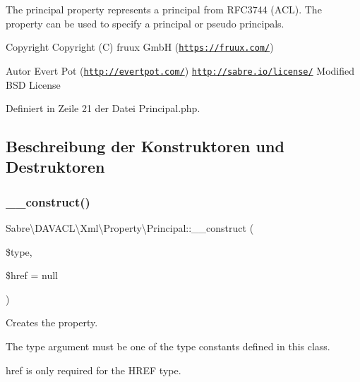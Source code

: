 The principal property represents a principal from R\+F\+C3744 (A\+CL). The property can be used to specify a principal or pseudo principals.

\begin{DoxyCopyright}{Copyright}
Copyright (C) fruux GmbH (\href{https://fruux.com/}{\tt https\+://fruux.\+com/}) 
\end{DoxyCopyright}
\begin{DoxyAuthor}{Autor}
Evert Pot (\href{http://evertpot.com/}{\tt http\+://evertpot.\+com/})  \href{http://sabre.io/license/}{\tt http\+://sabre.\+io/license/} Modified B\+SD License 
\end{DoxyAuthor}


Definiert in Zeile 21 der Datei Principal.\+php.



\subsection{Beschreibung der Konstruktoren und Destruktoren}
\mbox{\label{class_sabre_1_1_d_a_v_a_c_l_1_1_xml_1_1_property_1_1_principal_ac736f88ab664e591f726dc2b05b475b3}} 
\subsubsection{\texorpdfstring{\+\_\+\+\_\+construct()}{\_\_construct()}}
{\footnotesize\ttfamily Sabre\textbackslash{}\+D\+A\+V\+A\+C\+L\textbackslash{}\+Xml\textbackslash{}\+Property\textbackslash{}\+Principal\+::\+\_\+\+\_\+construct (\begin{DoxyParamCaption}\item[{}]{\$type,  }\item[{}]{\$href = {\ttfamily null} }\end{DoxyParamCaption})}

Creates the property.

The \textquotesingle{}type\textquotesingle{} argument must be one of the type constants defined in this class.

\textquotesingle{}href\textquotesingle{} is only required for the H\+R\+EF type.


